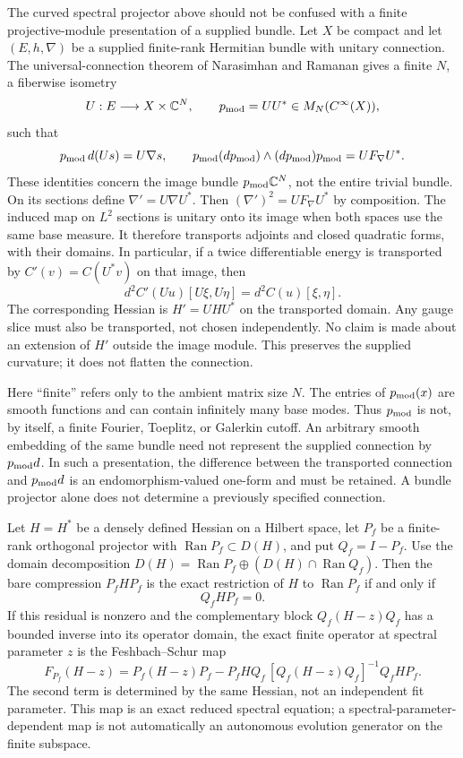 \documentclass[11pt]{article}
\begin{document}
The curved spectral projector above should not be confused with a finite
projective-module presentation of a supplied bundle. Let $X$ be compact and
let $(E,h,\nabla)$ be a supplied finite-rank Hermitian bundle with unitary
connection. The universal-connection theorem of Narasimhan and Ramanan
\cite{NarasimhanRamanan1961} gives a finite $N$, a
fiberwise isometry
\[
U:E\longrightarrow X\times\mathbb C^N,
\qquad p_{\rm mod}=UU^\ast\in M_N(C^\infty(X)),
\]
such that
\[
p_{\rm mod}\,d(Us)=U\nabla s,
\qquad
p_{\rm mod}(dp_{\rm mod})\wedge(dp_{\rm mod})p_{\rm mod}
=UF_\nabla U^\ast.
\]
These identities concern the image bundle $p_{\rm mod}\mathbb C^N$, not the
entire trivial bundle. On its sections define $\nabla'=U\nabla U^\ast$.
Then $(\nabla')^2=UF_\nabla U^\ast$ by composition. The induced map on
$L^2$ sections is unitary onto its image when both spaces use the same base
measure. It therefore transports adjoints and closed quadratic forms, with
their domains. In particular, if a twice differentiable energy is transported
by $C'(v)=C(U^\ast v)$ on that image, then
\[
d^2C'(Uu)[U\xi,U\eta]=d^2C(u)[\xi,\eta].
\]
The corresponding Hessian is $H'=UHU^\ast$ on the transported domain.
Any gauge slice must also be transported, not chosen independently.
No claim is made about an extension of $H'$ outside the image module.
This preserves the supplied curvature; it does not flatten the connection.

Here ``finite'' refers only to the ambient matrix size $N$. The entries of
$p_{\rm mod}(x)$ are smooth functions and can contain infinitely many base
modes. Thus $p_{\rm mod}$ is not, by itself, a finite Fourier, Toeplitz, or
Galerkin cutoff. An arbitrary smooth embedding of the same bundle need not
represent the supplied connection by $p_{\rm mod}d$. In such a presentation,
the difference between the transported connection and $p_{\rm mod}d$ is an
endomorphism-valued one-form and must be retained. A bundle projector alone
does not determine a previously specified connection.

\begin{theorem}\label{thm:finite-reduction}
Let $H=H^\ast$ be a densely defined Hessian on a Hilbert space, let $P_f$ be a
finite-rank orthogonal projector with $\operatorname{Ran}P_f\subset D(H)$,
and put $Q_f=I-P_f$. Use the domain decomposition
$D(H)=\operatorname{Ran}P_f\oplus(D(H)\cap\operatorname{Ran}Q_f)$.
Then the bare compression $P_fHP_f$ is the exact restriction of $H$ to
$\operatorname{Ran}P_f$ if and only if
\[
Q_fHP_f=0.
\]
If this residual is nonzero and the complementary block
$Q_f(H-z)Q_f$ has a bounded inverse into its operator domain, the exact
finite operator at spectral parameter $z$ is the Feshbach--Schur map
\[
F_{P_f}(H-z)
=P_f(H-z)P_f
-P_fHQ_f\,[Q_f(H-z)Q_f]^{-1}Q_fHP_f.
\]
The second term is determined by the same Hessian, not an independent fit
parameter. This map is an exact reduced spectral equation; a
spectral-parameter-dependent map is not automatically an autonomous evolution
generator on the finite subspace.
\end{theorem}
\end{document}
